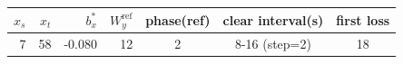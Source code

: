 \begin{tabular}{rrrrccc}
\toprule
$x_s$ & $x_t$ & $b_x^{*}$ & $W_y^{\mathrm{ref}}$ & phase(ref) & clear interval(s) & first loss \\
\midrule
7 & 58 & -0.080 & 12 & 2 & 8-16 (step=2) & 18 \\
\bottomrule
\end{tabular}